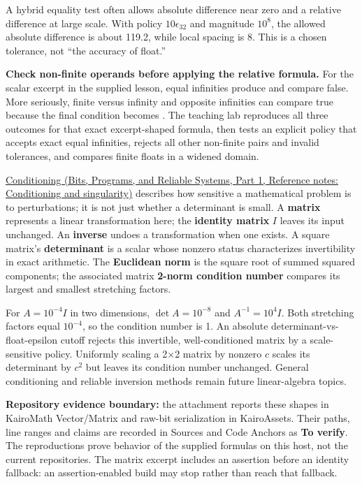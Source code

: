 A hybrid equality test often allows absolute difference near zero and a relative difference at large scale. With policy \(10\epsilon_{32}\) and magnitude \(10^8\), the allowed absolute difference is about 119.2, while local spacing is 8. This is a chosen tolerance, not ``the accuracy of float.''

\textbf{Check non-finite operands before applying the relative formula.} For the scalar excerpt in the supplied lesson, equal infinities produce  and compare false. More seriously, finite versus infinity and opposite infinities can compare true because the final condition becomes . The teaching lab reproduces all three outcomes for that exact excerpt-shaped formula, then tests an explicit policy that accepts exact equal infinities, rejects all other non-finite pairs and invalid tolerances, and compares finite floats in a widened domain.

\href{../01-Bits-Programs-and-Reliable-Systems-P01/main.pdf\#appendix-8f6a01f284a7}{Conditioning (Bits, Programs, and Reliable Systems, Part 1, Reference notes: Conditioning and singularity)} describes how sensitive a mathematical problem is to perturbations; it is not just whether a determinant is small. A \textbf{matrix} represents a linear transformation here; the \textbf{identity matrix} \(I\) leaves its input unchanged. An \textbf{inverse} undoes a transformation when one exists. A square matrix's \textbf{determinant} is a scalar whose nonzero status characterizes invertibility in exact arithmetic. The \textbf{Euclidean norm} is the square root of summed squared components; the associated matrix \textbf{2-norm condition number} compares its largest and smallest stretching factors.

For \(A=10^{-4}I\) in two dimensions, \(\det A=10^{-8}\) and \(A^{-1}=10^4I\). Both stretching factors equal \(10^{-4}\), so the condition number is 1. An absolute determinant-vs-float-epsilon cutoff rejects this invertible, well-conditioned matrix by a scale-sensitive policy. Uniformly scaling a 2×2 matrix by nonzero \(c\) scales its determinant by \(c^2\) but leaves its condition number unchanged. General conditioning and reliable inversion methods remain future linear-algebra topics.

\textbf{Repository evidence boundary:} the attachment reports these shapes in KairoMath Vector/Matrix and raw-bit serialization in KairoAssets. Their paths, line ranges and claims are recorded in Sources and Code Anchors as \textbf{To verify}. The reproductions prove behavior of the supplied formulas on this host, not the current repositories. The matrix excerpt includes an assertion before an identity fallback: an assertion-enabled build may stop rather than reach that fallback.

